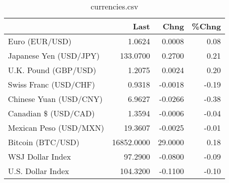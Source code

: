 \documentclass{article}%
\begin{document}
%


\begin{table}[htbp]%
\caption{currencies.csv}%
\centering%
\begin{adjustbox}{width=1\textwidth}%
\begin{tabular}{lrrr}
\toprule
                       &       Last &    Chng &  \%Chng \\
\midrule
        Euro (EUR/USD) &     1.0624 &  0.0008 &   0.08 \\
Japanese Yen (USD/JPY) &   133.0700 &  0.2700 &   0.21 \\
  U.K. Pound (GBP/USD) &     1.2075 &  0.0024 &   0.20 \\
 Swiss Franc (USD/CHF) &     0.9318 & -0.0018 &  -0.19 \\
Chinese Yuan (USD/CNY) &     6.9627 & -0.0266 &  -0.38 \\
  Canadian \$ (USD/CAD) &     1.3594 & -0.0006 &  -0.04 \\
Mexican Peso (USD/MXN) &    19.3607 & -0.0025 &  -0.01 \\
     Bitcoin (BTC/USD) & 16852.0000 & 29.0000 &   0.18 \\
      WSJ Dollar Index &    97.2900 & -0.0800 &  -0.09 \\
     U.S. Dollar Index &   104.3200 & -0.1100 &  -0.10 \\
\bottomrule
\end{tabular}
%
\end{adjustbox}%
\end{table}

%
\end{document}

